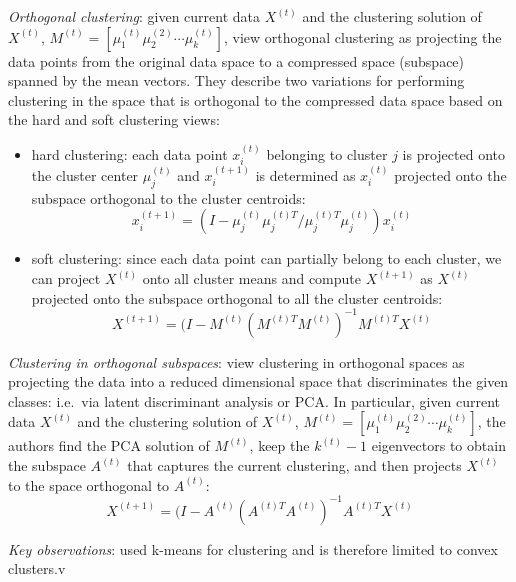 \documentclass{article}
\numberwithin{equation}{section}
\numberwithin{thm}{section}
\begin{document}
\textit{Orthogonal clustering}: given current data $X^{(t)}$ and the clustering solution of $X^{(t)}$, $M^{(t)} = [\mu_1^{(t)} \mu_2^{(2)} \cdots \mu_k^{(t)}]$, \citet{Cui2007} view orthogonal clustering as projecting the data points from the original data space to a compressed space (subspace) spanned by the mean vectors. They describe two variations for performing clustering in the space that is orthogonal to the compressed data space based on the hard and soft clustering views:
\begin{itemize}
\item hard clustering: each data point $x_i^{(t)}$ belonging to cluster $j$ is projected onto the cluster center $\mu_j^{(t)}$ and $x_i^{(t+1)}$ is determined as $x_i^{(t)}$ projected onto the subspace orthogonal to the cluster centroids:
$$
x_i^{(t+1)} = (I - \mu_j^{(t)}\mu_j^{(t)T}/\mu_j^{(t)T}\mu_j^{(t)})x_i^{(t)}
$$
%
\item soft clustering: since each data point can partially belong to each cluster, we can project $X^{(t)}$ onto all cluster means and compute $X^{(t+1)}$ as $X^{(t)}$ projected onto the subspace orthogonal to all the cluster centroids:
$$
X^{(t+1)} = (I-M^{(t)}(M^{(t)T}M^{(t)})^{-1}M^{(t)T}X^{(t)} 
$$
\end{itemize}
%

\textit{Clustering in orthogonal subspaces}: \citet{Cui2007} view clustering in orthogonal spaces as projecting the data into a reduced dimensional space that discriminates the given classes: i.e.\ via latent discriminant analysis or PCA. In particular, given current data $X^{(t)}$ and the clustering solution of $X^{(t)}$, $M^{(t)} = [\mu_1^{(t)} \mu_2^{(2)} \cdots \mu_k^{(t)}]$, the authors find the PCA solution of $M^{(t)}$, keep the $k^{(t)}-1$ eigenvectors to obtain the subspace $A^{(t)}$ that captures the current clustering, and then projects $X^{(t)}$ to the space orthogonal to $A^{(t)}$:
$$
X^{(t+1)} = (I-A^{(t)}(A^{(t)T}A^{(t)})^{-1}A^{(t)T}X^{(t)} 
$$

\textit{Key observations}: \citet{Cui2007} used k-means for clustering and is therefore limited to convex clusters.v
\end{document}
